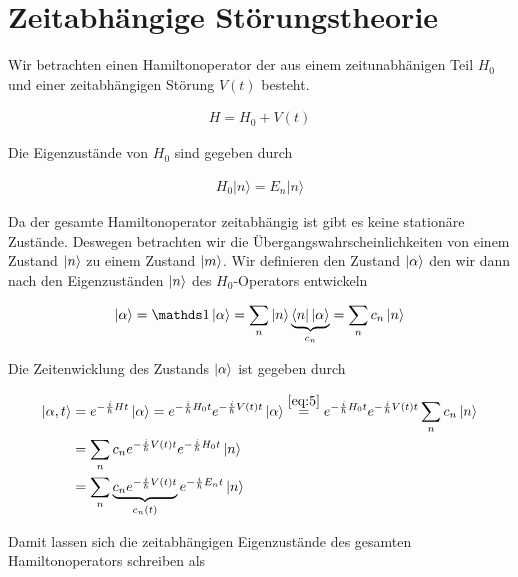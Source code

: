 
\usepackage{amsmath}                %
\usepackage{amsfonts}




\section*{Zeitabhängige Störungstheorie}

Wir betrachten einen Hamiltonoperator der aus einem zeitunabhänigen Teil \(H_0\) und einer zeitabhängigen Störung \(V(t)\) besteht.

\begin{align}
  \label{eq:2}
  H=H_0+V(t)
\end{align}

Die Eigenzustände von \(H_0\) sind gegeben durch

\begin{align}
  \label{eq:1}
   H_0 |n\rangle = E_n|n\rangle
\end{align}

Da der gesamte Hamiltonoperator zeitabhängig ist gibt es keine stationäre Zustände. Deswegen betrachten wir die Übergangswahrscheinlichkeiten von einem Zustand \(\left| n \right\rangle\) zu einem Zustand \(\left| m \right\rangle\). Wir definieren den Zustand \(\left| \alpha \right\rangle\) den wir dann nach den Eigenzuständen \(\left| n \right\rangle\) des \(H_0\)-Operators entwickeln

\begin{align}
  \label{eq:5}
  \ket{\alpha} = \mathds 1 \ket{\alpha} = \sum_n \ket{n}\underbr{\bra{n} \ket{\alpha}}_{c_n} = \sum_n c_n \ket{n}
\end{align}

Die Zeitenwicklung des Zustands \(\left| \alpha \right\rangle\) ist gegeben durch

\begin{align}
  \label{eq:6}
  \ket{\alpha,t} &= e^{-\frac{i}{\hbar}Ht}\ket{\alpha} =  e^{-\frac{i}{\hbar}H_0t} e^{-\frac{i}{\hbar}V(t)t}\ket{\alpha} \stackrel{\eqref{eq:5}}= e^{-\frac{i}{\hbar}H_0t} e^{-\frac{i}{\hbar}V(t)t} \sum_n c_n \ket{n} \\
&=\sum_n c_n  e^{-\frac{i}{\hbar}V(t)t} e^{-\frac{i}{\hbar}H_0t} \ket{n} \\
&=\sum_n \underbr{c_n  e^{-\frac{i}{\hbar}V(t)t} }_{c_n(t)}e^{-\frac{i}{\hbar}E_nt} \ket{n}
\end{align}

Damit lassen sich die zeitabhängigen Eigenzustände des gesamten Hamiltonoperators schreiben als

